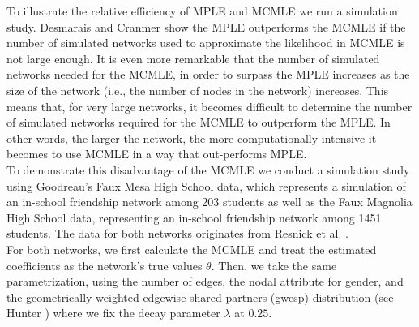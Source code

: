 \documentclass{llncs}
\begin{document}
To illustrate the relative efficiency of MPLE and MCMLE we run a simulation study. Desmarais and Cranmer \cite{Desmarais.2012} show the MPLE outperforms the MCMLE if the number of simulated networks used to approximate the likelihood in MCMLE is not large enough. It is even more remarkable that the number of simulated networks needed for the MCMLE, in order to surpass the MPLE increases as the size of the network (i.e., the number of nodes in the network) increases. This means that, for very large networks, it becomes difficult to determine the number of simulated networks required for the MCMLE to outperform the MPLE. In other words, the larger the network, the more computationally intensive it becomes to use MCMLE in a way that out-performs MPLE.\\
\indent To demonstrate this disadvantage of the MCMLE we conduct a simulation study using Goodreau's \cite{HunterDavidR..2008} Faux Mesa High School data, which represents a simulation of an in-school friendship network among 203 students as well as the Faux Magnolia High School data, representing an in-school friendship network among 1451 students. The data for both networks originates from Resnick et al. \cite{Resnicketal1997}.\\
\indent For both networks, we first calculate the MCMLE and treat the estimated coefficients as the network's true values $\theta$. Then, we take the same parametrization, using the number of edges, the nodal attribute for gender, and the geometrically weighted edgewise shared partners (gwesp) distribution (see Hunter \cite{Hunter.2006}) where we fix the decay parameter $\lambda$ at $0.25$.
\end{document}
